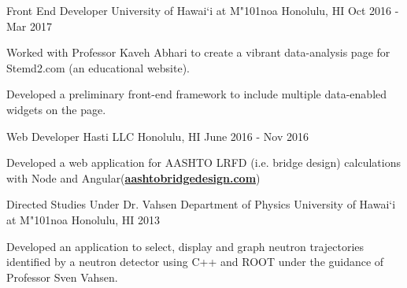 \begin{cventries}
	\cventry
	{Front End Developer}
	{University of Hawai`i at M{\char"101}noa}
	{Honolulu, HI}
	{Oct 2016 - Mar 2017}
	{
		\begin{cvitems}
			\item {Worked with Professor Kaveh Abhari to create a vibrant data-analysis page for Stemd2.com (an educational website).}
			\item {Developed a preliminary front-end framework to include multiple data-enabled widgets on the page.}
		\end{cvitems}
	}

    \cventry
    {Web Developer}
    {Hasti LLC}
    {Honolulu, HI}
    {June 2016 - Nov 2016}
    {
        \begin{cvitems}
            \item {Developed a web application for AASHTO LRFD (i.e. bridge design) calculations with Node and Angular(\textbf{\href{http://www.aashtobridgedesign.com}{aashtobridgedesign.com}})}
        \end{cvitems}
    }

	
	\cventry
	{Directed Studies Under Dr. Vahsen}
	{Department of Physics University of Hawai`i at M{\char"101}noa}
	{Honolulu, HI}
	{2013}
	{
		\begin{cvitems}
			\item {Developed an application to select, display and graph neutron trajectories identified by a neutron detector using C++ and
				ROOT under the guidance of Professor Sven Vahsen.}
		\end{cvitems}
	}


\end{cventries}
